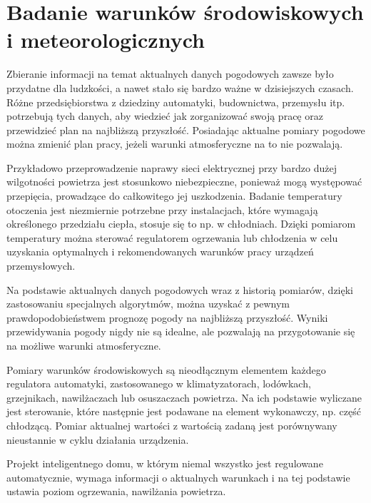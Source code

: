 \chapter{Badanie warunków środowiskowych i meteorologicznych}
Zbieranie informacji na temat aktualnych danych pogodowych zawsze było przydatne dla ludzkości, a nawet stało się bardzo ważne w dzisiejszych czasach. Różne przedsiębiorstwa z dziedziny automatyki, budownictwa, przemysłu itp. potrzebują tych danych, aby wiedzieć jak zorganizować swoją pracę oraz przewidzieć plan na najbliższą przyszłość. Posiadając aktualne pomiary pogodowe można zmienić plan pracy, jeżeli warunki atmosferyczne na to nie pozwalają.

Przykładowo przeprowadzenie naprawy sieci elektrycznej przy bardzo dużej wilgotności powietrza jest stosunkowo niebezpieczne, ponieważ mogą występować przepięcia, prowadzące do całkowitego jej uszkodzenia. Badanie temperatury otoczenia jest niezmiernie potrzebne przy instalacjach, które wymagają określonego przedziału ciepła, stosuje się to np. w chłodniach. Dzięki pomiarom temperatury można sterować regulatorem ogrzewania lub chłodzenia w celu uzyskania optymalnych i rekomendowanych warunków pracy urządzeń przemysłowych.

Na podstawie aktualnych danych pogodowych wraz z historią pomiarów, dzięki zastosowaniu specjalnych algorytmów, można uzyskać z pewnym prawdopodobieństwem prognozę pogody na najbliższą przyszłość. Wyniki przewidywania pogody nigdy nie są idealne, ale pozwalają na przygotowanie się na możliwe warunki atmosferyczne.

Pomiary warunków środowiskowych są nieodłącznym elementem każdego regulatora automatyki, zastosowanego w klimatyzatorach, lodówkach, grzejnikach, nawilżaczach lub osuszaczach powietrza. Na ich podstawie wyliczane jest sterowanie, które następnie jest podawane na element wykonawczy, np. część chłodzącą. Pomiar aktualnej wartości z wartością zadaną jest porównywany nieustannie w cyklu działania urządzenia.

Projekt inteligentnego domu, w którym niemal wszystko jest regulowane automatycznie, wymaga informacji o aktualnych warunkach i na tej podstawie ustawia poziom ogrzewania, nawilżania powietrza.
